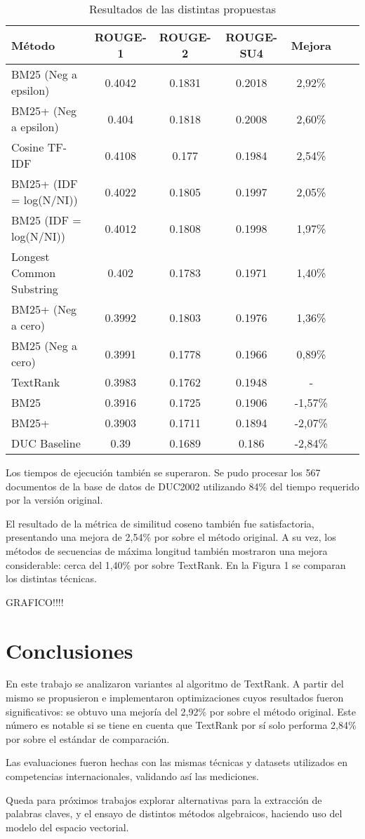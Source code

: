\documentclass{llncs}
\begin{document}
\begin{table}
\caption{Resultados de las distintas propuestas}
\begin{center}
\begin{tabular}{l*{5}{c}r}
\hline
\rule{0pt}{12pt}
Método & ROUGE-1 & ROUGE-2 & ROUGE-SU4 & Mejora \\[2pt]
\hline\rule{0pt}{12pt}
BM25 (Neg a epsilon) & 0.4042 & 0.1831 & 0.2018 & 2,92\% \\
BM25+ (Neg a epsilon) & 0.404 & 0.1818 & 0.2008 & 2,60\% \\
Cosine TF-IDF & 0.4108 & 0.177 & 0.1984 & 2,54\% \\
BM25+ (IDF = log(N/NI)) & 0.4022 & 0.1805 & 0.1997 & 2,05\% \\ 
BM25 (IDF = log(N/NI)) & 0.4012 & 0.1808 & 0.1998 & 1,97\% \\ 
Longest Common Substring & 0.402 & 0.1783 & 0.1971 & 1,40\% \\
BM25+ (Neg a cero) & 0.3992 & 0.1803 & 0.1976 & 1,36\% \\ 
BM25 (Neg a cero) & 0.3991 & 0.1778 & 0.1966 & 0,89\% \\
TextRank & 0.3983 & 0.1762 & 0.1948 & - \\
BM25 & 0.3916 & 0.1725 & 0.1906 & -1,57\% \\
BM25+ & 0.3903 & 0.1711 & 0.1894 & -2,07\% \\
DUC Baseline & 0.39 & 0.1689 & 0.186 & -2,84\% \\ [2pt]
\hline
\end{tabular}
\end{center}
\end{table}


Los tiempos de ejecución también se superaron. Se pudo procesar los 567 documentos de la base de datos de DUC2002 utilizando 84\% del tiempo requerido por la versión original.

El resultado de la métrica de similitud coseno también fue satisfactoria, presentando una mejora de 2,54\% por sobre el método original. A su vez, los métodos de secuencias de máxima longitud también mostraron una mejora considerable: cerca del 1,40\% por sobre TextRank. En la Figura 1 se comparan los distintas técnicas.

GRAFICO!!!!

\section{Conclusiones}
En este trabajo se analizaron variantes al algoritmo de TextRank. A partir del mismo se propusieron e implementaron optimizaciones cuyos resultados fueron significativos: se obtuvo una mejoría del 2,92\% por sobre el método original. Este número es notable si se tiene en cuenta que TextRank por sí solo performa 2,84\% por sobre el estándar de comparación.

Las evaluaciones fueron hechas con las mismas técnicas y datasets utilizados en competencias internacionales, validando así las mediciones.

Queda para próximos trabajos explorar alternativas para la extracción de palabras claves, y el ensayo de distintos métodos algebraicos, haciendo uso del modelo del espacio vectorial.
\end{document}
